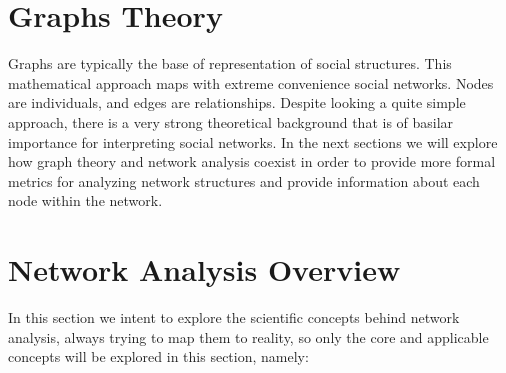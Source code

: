 \section{Graphs Theory}
Graphs are typically the base of representation of social structures. This mathematical approach maps with  extreme convenience social networks. Nodes are individuals, and edges are relationships. Despite looking a quite simple approach, there is a very strong theoretical background that is of basilar importance for interpreting social networks. In the next sections we will explore how graph theory and network analysis coexist in order to provide more formal metrics for analyzing network structures and provide information about each node within the network.

\section{Network Analysis Overview}
In this section we intent to explore the scientific concepts behind network analysis, always trying to map them to reality, so only the core
and applicable concepts will be explored in this section, namely:

